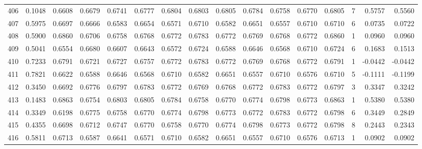 \begin{tabular}{lrrrrrrrrrrrrrrr}
406 &      0.1048 &  0.6608 &  0.6679 &  0.6741 &  0.6777 &  0.6804 &  0.6803 &  0.6805 &  0.6784 &  0.6758 &   0.6770 &     0.6805 &      7 &                    0.5757 &                     0.5560 \\
407 &      0.5975 &  0.6697 &  0.6666 &  0.6583 &  0.6654 &  0.6571 &  0.6710 &  0.6582 &  0.6651 &  0.6557 &   0.6710 &     0.6710 &      6 &                    0.0735 &                     0.0722 \\
408 &      0.5900 &  0.6860 &  0.6706 &  0.6758 &  0.6768 &  0.6772 &  0.6783 &  0.6772 &  0.6769 &  0.6768 &   0.6772 &     0.6860 &      1 &                    0.0960 &                     0.0960 \\
409 &      0.5041 &  0.6554 &  0.6680 &  0.6607 &  0.6643 &  0.6572 &  0.6724 &  0.6588 &  0.6646 &  0.6568 &   0.6710 &     0.6724 &      6 &                    0.1683 &                     0.1513 \\
410 &      0.7233 &  0.6791 &  0.6721 &  0.6727 &  0.6757 &  0.6772 &  0.6783 &  0.6772 &  0.6769 &  0.6768 &   0.6772 &     0.6791 &      1 &                   -0.0442 &                    -0.0442 \\
411 &      0.7821 &  0.6622 &  0.6588 &  0.6646 &  0.6568 &  0.6710 &  0.6582 &  0.6651 &  0.6557 &  0.6710 &   0.6576 &     0.6710 &      5 &                   -0.1111 &                    -0.1199 \\
412 &      0.3450 &  0.6692 &  0.6776 &  0.6797 &  0.6783 &  0.6772 &  0.6769 &  0.6768 &  0.6772 &  0.6783 &   0.6772 &     0.6797 &      3 &                    0.3347 &                     0.3242 \\
413 &      0.1483 &  0.6863 &  0.6754 &  0.6803 &  0.6805 &  0.6784 &  0.6758 &  0.6770 &  0.6774 &  0.6798 &   0.6773 &     0.6863 &      1 &                    0.5380 &                     0.5380 \\
414 &      0.3349 &  0.6198 &  0.6775 &  0.6758 &  0.6770 &  0.6774 &  0.6798 &  0.6773 &  0.6772 &  0.6783 &   0.6772 &     0.6798 &      6 &                    0.3449 &                     0.2849 \\
415 &      0.4355 &  0.6698 &  0.6712 &  0.6747 &  0.6770 &  0.6758 &  0.6770 &  0.6774 &  0.6798 &  0.6773 &   0.6772 &     0.6798 &      8 &                    0.2443 &                     0.2343 \\
416 &      0.5811 &  0.6713 &  0.6587 &  0.6641 &  0.6571 &  0.6710 &  0.6582 &  0.6651 &  0.6557 &  0.6710 &   0.6576 &     0.6713 &      1 &                    0.0902 &                     0.0902 \\

\end{tabular}
